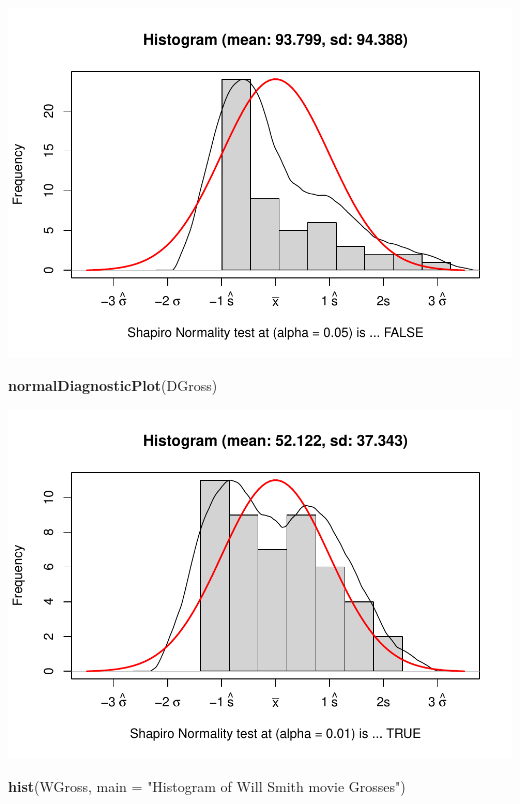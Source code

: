 \documentclass[]{article}
\newenvironment{Shaded}{\begin{snugshade}}{\end{snugshade}}
\newcommand{\DataTypeTok}[1]{\textcolor[rgb]{0.13,0.29,0.53}{#1}}
\newcommand{\KeywordTok}[1]{\textcolor[rgb]{0.13,0.29,0.53}{\textbf{#1}}}
\newcommand{\NormalTok}[1]{#1}
\newcommand{\StringTok}[1]{\textcolor[rgb]{0.31,0.60,0.02}{#1}}
\begin{document}
\includegraphics{Denzel-v-Will-data_files/figure-latex/unnamed-chunk-5-1.pdf}

\begin{Shaded}
\begin{Highlighting}[]
\KeywordTok{normalDiagnosticPlot}\NormalTok{(DGross)}
\end{Highlighting}
\end{Shaded}

\includegraphics{Denzel-v-Will-data_files/figure-latex/unnamed-chunk-5-2.pdf}

\begin{Shaded}
\begin{Highlighting}[]
\KeywordTok{hist}\NormalTok{(WGross, }\DataTypeTok{main =} \StringTok{"Histogram of Will Smith movie Grosses"}\NormalTok{)}
\end{Highlighting}
\end{Shaded}
\end{document}
